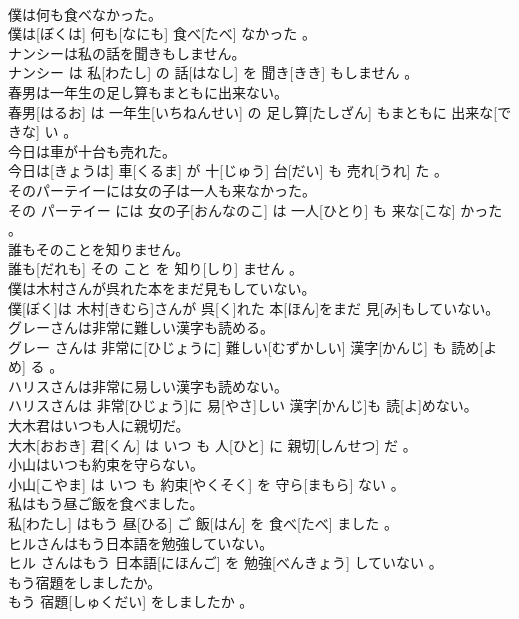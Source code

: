 \documentclass[8pt]{extreport}
\begin{document}
\begin{CJK}{UTF8}{min}
\\	僕は何も食べなかった。	
\\	僕は[ぼくは] 何も[なにも] 食べ[たべ] なかった 。
\\	ナンシーは私の話を聞きもしません。	
\\	ナンシー は 私[わたし] の 話[はなし] を 聞き[きき] もしません 。
\\	春男は一年生の足し算もまともに出来ない。	
\\	春男[はるお] は 一年生[いちねんせい] の 足し算[たしざん] もまともに 出来な[できな] い 。
\\	今日は車が十台も売れた。	
\\	今日は[きょうは] 車[くるま] が 十[じゅう] 台[だい] も 売れ[うれ] た 。
\\	そのパーテイーには女の子は一人も来なかった。	
\\	その パーテイー には 女の子[おんなのこ] は 一人[ひとり] も 来な[こな] かった 。
\\	誰もそのことを知りません。	
\\	誰も[だれも] その こと を 知り[しり] ません 。
\\	僕は木村さんが呉れた本をまだ見もしていない。	
\\	僕[ぼく]は 木村[きむら]さんが 呉[く]れた 本[ほん]をまだ 見[み]もしていない。
\\	グレーさんは非常に難しい漢字も読める。	
\\	グレー さんは 非常に[ひじょうに] 難しい[むずかしい] 漢字[かんじ] も 読め[よめ] る 。
\\	ハリスさんは非常に易しい漢字も読めない。	
\\	ハリスさんは 非常[ひじょう]に 易[やさ]しい 漢字[かんじ]も 読[よ]めない。
\\	大木君はいつも人に親切だ。	
\\	大木[おおき] 君[くん] は いつ も 人[ひと] に 親切[しんせつ] だ 。
\\	小山はいつも約束を守らない。	
\\	小山[こやま] は いつ も 約束[やくそく] を 守ら[まもら] ない 。
\\	私はもう昼ご飯を食べました。	
\\	私[わたし] はもう 昼[ひる] ご 飯[はん] を 食べ[たべ] ました 。
\\	ヒルさんはもう日本語を勉強していない。	
\\	ヒル さんはもう 日本語[にほんご] を 勉強[べんきょう] していない 。
\\	もう宿題をしましたか。	
\\	もう 宿題[しゅくだい] をしましたか 。

\end{CJK}
\end{document}
